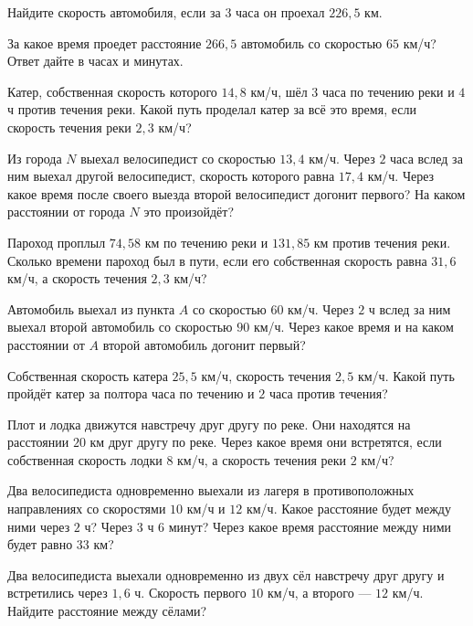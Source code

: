 \begin{class}[number=5]
	\begin{listofex}
		\item  Найдите скорость автомобиля, если за \( 3 \) часа он проехал \( 226,5 \) км.
		\item За какое время проедет расстояние \( 266,5 \) автомобиль со скоростью \( 65 \) км/ч? Ответ дайте в часах и минутах.
		\item Катер, собственная скорость которого \( 14,8 \) км/ч, шёл \( 3 \) часа по течению реки и \( 4 \) ч против течения реки. Какой путь проделал катер за всё это время, если скорость течения реки \( 2,3 \) км/ч?
		\item Из города \( N \) выехал велосипедист со скоростью \( 13,4 \) км/ч. Через \( 2 \) часа вслед за ним выехал другой велосипедист, скорость которого равна \( 17,4 \) км/ч. Через какое время после своего выезда второй велосипедист догонит первого? На каком расстоянии от города \( N \) это произойдёт?
		\item Пароход проплыл \( 74,58 \) км по течению реки и \( 131,85 \) км против течения реки. Сколько времени пароход был в пути, если его собственная скорость равна \( 31,6 \) км/ч, а скорость течения \( 2,3 \) км/ч?
		\item Автомобиль выехал из пункта \( A \) со скоростью \( 60 \) км/ч. Через \( 2 \) ч вслед за ним выехал второй автомобиль со скоростью \( 90 \) км/ч. Через какое время и на каком расстоянии от \( A \) второй автомобиль догонит первый?
		\item Собственная скорость катера \( 25,5 \) км/ч, скорость течения \( 2,5 \) км/ч. Какой путь пройдёт 
		катер за полтора часа по течению и \( 2 \) часа против течения?
		\item  Плот и лодка движутся навстречу друг другу по реке. Они находятся на расстоянии \( 20 \) км друг другу по реке. Через какое время они встретятся, если собственная скорость лодки \( 8 \) км/ч, а скорость течения реки \( 2 \) км/ч?
		\item Два велосипедиста одновременно выехали из лагеря в противоположных направлениях со скоростями \( 10 \) км/ч и \( 12 \) км/ч. Какое расстояние будет между ними через \( 2 \) ч? Через \( 3 \) ч \( 6 \) минут? Через какое время расстояние между ними будет равно \( 33 \) км?
		\item Два велосипедиста выехали одновременно из двух сёл навстречу друг другу и встретились через \( 1,6  \) ч. Скорость первого \( 10 \) км/ч, а второго --- \( 12  \) км/ч. Найдите расстояние между сёлами?

\end{listofex}
\end{class}
